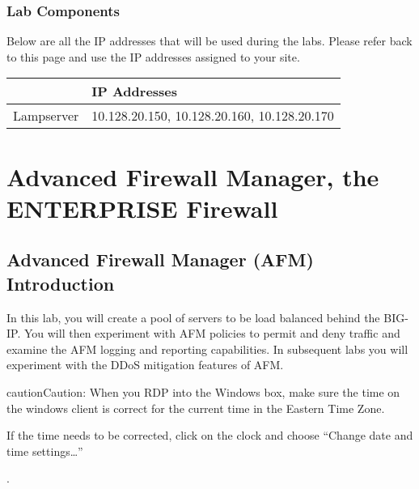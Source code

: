 \documentclass[letterpaper,10pt,english]{sphinxmanual}
\begin{document}
\subsection{Lab Components}
\label{\detokenize{intro:lab-components}}
Below are all the IP addresses that will be used during the labs. Please
refer back to this page and use the IP addresses assigned to your site.


\begin{savenotes}\sphinxattablestart
\centering
\begin{tabulary}{\linewidth}[t]{|T|T|}
\hline
&
IP Addresses
\\
\hline
Lampserver
&
10.128.20.150, 10.128.20.160, 10.128.20.170
\\
\hline
\end{tabulary}
\par
\sphinxattableend\end{savenotes}


\chapter{Advanced Firewall Manager, the ENTERPRISE Firewall}
\label{\detokenize{class1/class1:afm-the-enterprise-firewall}}\label{\detokenize{class1/class1::doc}}

\section{Advanced Firewall Manager (AFM) Introduction}
\label{\detokenize{class1/module1/module1:afm-afm-introduction}}\label{\detokenize{class1/module1/module1::doc}}
In this lab, you will create a pool of servers to be load balanced
behind the BIG-IP. You will then experiment with AFM policies to permit
and deny traffic and examine the AFM logging and reporting capabilities.
In subsequent labs you will experiment with the DDoS mitigation features
of AFM.

\begin{sphinxadmonition}{caution}{Caution:}
When you RDP into the Windows box, make sure the time on the windows
client is correct for the current time in the Eastern Time Zone.

If the time needs to be corrected, click on the clock and choose “Change
date and time settings…”


.
\end{sphinxadmonition}
\end{document}
